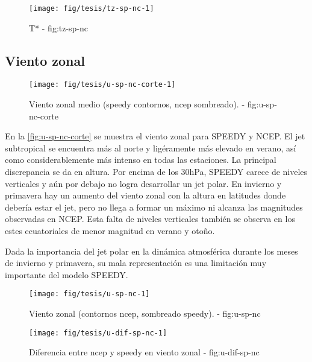 \documentclass[spanish,a4paper,12p]{book}
\begin{document}
\begin{figure*}
\texttt{[image: fig/tesis/tz-sp-nc-1]} \caption{T* - fig:tz-sp-nc}\label{fig:tz-sp-nc}
\end{figure*}

\subsection{Viento zonal}\label{viento-zonal-1}

\begin{figure}

{\centering \texttt{[image: fig/tesis/u-sp-nc-corte-1]} 

}

\caption{Viento zonal medio (speedy contornos, ncep sombreado). - fig:u-sp-nc-corte}\label{fig:u-sp-nc-corte}
\end{figure}

En la \autoref{fig:u-sp-nc-corte} se muestra el viento zonal para SPEEDY
y NCEP. El jet subtropical se encuentra más al norte y ligéramente más
elevado en verano, así como considerablemente más intenso en todas las
estaciones. La principal discrepancia se da en altura. Por encima de los
30hPa, SPEEDY carece de niveles verticales y aún por debajo no logra
desarrollar un jet polar. En invierno y primavera hay un aumento del
viento zonal con la altura en latitudes donde debería estar el jet, pero
no llega a formar un máximo ni alcanza las magnitudes observadas en
NCEP. Esta falta de niveles verticales también se observa en los estes
ecuatoriales de menor magnitud en verano y otoño.

Dada la importancia del jet polar en la dinámica atmosférica durante los
meses de invierno y primavera, su mala representación es una
limitación muy importante del modelo SPEEDY.

\begin{landscape}\begin{figure}

{\centering \texttt{[image: fig/tesis/u-sp-nc-1]} 

}

\caption{Viento zonal (contornos ncep, sombreado speedy). - fig:u-sp-nc}\label{fig:u-sp-nc}
\end{figure}
\end{landscape}

\begin{figure*}
\texttt{[image: fig/tesis/u-dif-sp-nc-1]} \caption{Diferencia entre ncep y speedy en viento zonal - fig:u-dif-sp-nc}\label{fig:u-dif-sp-nc}
\end{figure*}
\end{document}
